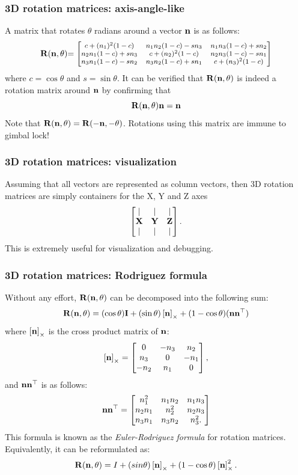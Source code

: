 \documentclass{beamer}
\begin{document}
\begin{frame}
\frametitle{3D rotation matrices: axis-angle-like}
A matrix that rotates $\theta$ radians around a vector $\rotaxisn$ is as follows:
\begin{equation*}\label{matrix:angle_axis_form}
	\rotmat{\rotaxis{n}}{\theta}
	{	\footnotesize
		=\begin{bmatrix}
			c+(n_1)^2(1-c)&n_1n_2(1-c)-sn_3&n_1n_3(1-c)+sn_2\\
			n_2n_1(1-c)+sn_3&c+(n_2)^2(1-c)&n_2n_3(1-c)-sn_1\\
			n_3n_1(1-c)-sn_2&n_3n_2(1-c)+sn_1&c+(n_3)^2(1-c)
	\end{bmatrix}}	
\end{equation*}
where $c=\cos\theta$ and $s=\sin\theta$. 
It can be verified that $\rotmat{\rotaxis{n}}{\theta}$ is indeed a rotation matrix around $\rotaxis{n}$ by confirming that 
$$
\rotmat{\rotaxis{n}}{\theta}\rotaxisn = \rotaxisn
$$ 
\vfill
Note that $\rotmat{\rotaxis{n}}{\theta} = \rotmat{\rotaxis{-n}}{-\theta}$.
\vfill
Rotations using this matrix are immune to gimbal lock!
\end{frame}

\begin{frame}
	\frametitle{3D rotation matrices: visualization}
	Assuming that all vectors are represented as column vectors, then 3D rotation matrices are simply containers for the X, Y and Z axes   
$$
\begin{bmatrix}
	\vert & \vert & \vert \\
	\grotaxis{x}   & \grotaxis{y}   &  \grotaxis{z}\\
	\vert & \vert & \vert
\end{bmatrix}.
$$
This is extremely useful for visualization and debugging. 
\end{frame}

\begin{frame}
	\frametitle{3D rotation matrices: Rodriguez formula}
	Without any effort, $\rotmat{\rotaxis{n}}{\theta}$ can be decomposed into the following sum:
	\begin{equation*} 
		\rotmat{\rotaxis{n}}{\theta} = (\cos\theta) \mathbf{I} + (\sin\theta) \crossmat{\rotaxis{n}} + (1-\cos\theta)(\rotaxis{n}\rotaxis{n}^\top)
	\end{equation*}
	where $\crossmat{\rotaxis{n}}$ is the cross product matrix of $\rotaxis{n}$:
	$$
	\crossmat{\rotaxis{n}} = \crossmatfull{n_1}{n_2}{n_3},
	$$
	and $\rotaxis{n}\rotaxis{n}^\top$ is as follows:
	$$
	\rotaxis{n}\rotaxis{n}^\top = \begin{bmatrix}
					n_1^2&n_1n_2&n_1n_3\\
		n_2n_1&n_2^2&n_2n_3\\
		n_3n_1&n_3n_2&n_3^2.
	\end{bmatrix}
	$$
	This formula is known as the \textit{Euler-Rodriguez formula} for rotation matrices.
	Equivalently, it can be reformulated as:
	$$
		\rotmat{\rotaxis{n}}{\theta} =  I + (sin\theta) \crossmat{\rotaxis{n}} + (1-\cos\theta)\crossmat{\rotaxis{n}}^2.
	$$
	\end{frame}
\end{document}
